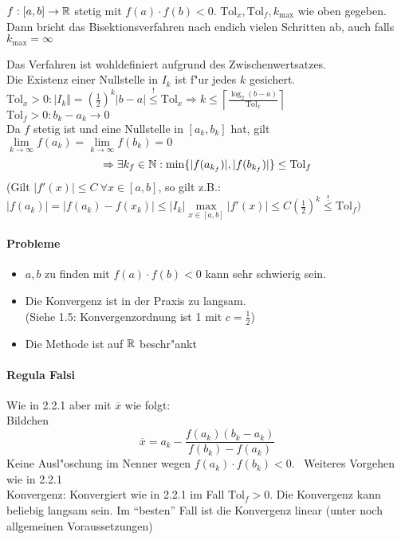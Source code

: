 \documentclass{scrartcl}
\begin{document}
\begin{Satz}
$f: [a,b] \rightarrow \mathbb{R}$ stetig mit $f(a) \cdot f(b) < 0$. $\mathrm{Tol}_x, \mathrm{Tol}_f, k_\mathrm{max}$ wie oben gegeben. \\
Dann bricht das Bisektionsverfahren nach endich vielen Schritten ab, auch falls $k_\mathrm{max} = \infty$
\end{Satz}
\begin{Bew}
Das Verfahren ist wohldefiniert aufgrund des Zwischenwertsatzes. \\
Die Existenz einer Nullstelle in $I_k$ ist f"ur jedes $k$ gesichert. \\
$\mathrm{Tol}_x > 0: \vert I_k \Vert = \left( \frac12 \right)^k \vert b - a \vert \stackrel{!}{\leq} \mathrm{Tol}_x \Rightarrow k \leq \left\lceil \frac{ \log_2 (b-a) }{\mathrm{Tol}_x } \right\rceil$ \\
$\mathrm{Tol}_f > 0: b_k - a_k \rightarrow 0$ \\
Da $f$ stetig ist und eine Nullstelle in $[a_k, b_k]$ hat, gilt $\lim\limits_{k \rightarrow \infty} f(a_k) = \lim\limits_{k \rightarrow \infty} f(b_k) = 0$
$$ \Rightarrow \exists k_f \in \mathbb{N}: \min \{ \vert f(a_{k_f}) \vert, \vert f(b_{k_f}) \vert \} \leq \mathrm{Tol}_f$$
(Gilt $\vert f'(x) \vert \leq C \ \forall x \in [a,b]$, so gilt z.B.: 
$\vert f(a_k) \vert = \vert f(a_k) - f(x_k) \vert \leq \vert I_k \vert \max\limits_{x \in [a,b]} \vert f'(x) \vert \leq C \left( \frac{1}{2} \right)^k \stackrel{!}{\leq} \mathrm{Tol}_f )$
\end{Bew}
\paragraph*{Probleme}
\begin{itemize}
\item $a,b$ zu finden mit $f(a) \cdot f(b) < 0$ kann sehr schwierig sein. 
\item Die Konvergenz ist in der Praxis zu langsam. \\
(Siehe 1.5: Konvergenzordnung ist 1 mit $c=\frac12$)
\item Die Methode ist auf $\mathbb{R}$ beschr"ankt
\end{itemize}

\paragraph{Regula Falsi}
Wie in 2.2.1 aber mit $\overline x$ wie folgt: \\
Bildchen \\
$$ \overline x = a_k - \frac{ f(a_k) (b_k - a_k) }{ f(b_k) - f(a_k) }$$
Keine Ausl"oschung im Nenner wegen $f(a_k) \cdot f(b_k) < 0$. \
Weiteres Vorgehen wie in 2.2.1 \\
Konvergenz: Konvergiert wie in 2.2.1 im Fall $\mathrm{Tol}_f > 0$. Die Konvergenz kann beliebig langsam sein. Im "`besten"' Fall ist die Konvergenz linear (unter noch allgemeinen Voraussetzungen)
\end{document}
